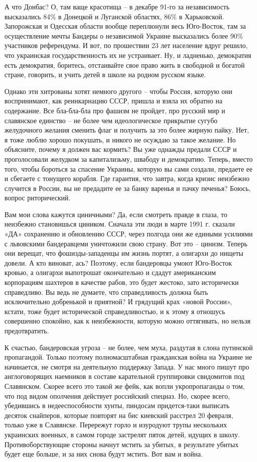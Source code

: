 А что Донбас? О, там ваще красотища – в декабре 91-го за независимость
высказались 84\% в Донецкой и Луганской областях, 86\% в Харьковской. Запорожская
и Одесская области вообще переплюнули весь Юго-Восток, там за осуществление
мечты Бандеры о независимой Украине высказались более 90\% участников
референдума. И вот, по прошествии 23 лет население вдруг решило, что украинская
государственность их не устраивает. Ну, и ладненько, демократия есть
демократия, боритесь, отстаивайте  свое право жить в свободной и богатой
стране, говорить, и учить детей в школе на родном русском языке.

Однако эти хитрованы хотят немного другого – чтобы Россия, которую они
воспринимают, как реинкарнацию СССР,  пришла и взяла их обратно на содержание.
Все бла-бла-бла про фашизм не пройдет, про русский мир и славянское единство –
не более чем идеологическое прикрытие сугубо желудочного желания сменить флаг и
получить за это более жирную пайку. Нет, я тоже люблю хорошо покушать, и никого
не осуждаю за такое желание. Но объясните, почему я должен вас кормить? Вы уже
однажды предали СССР и проголосовали желудком за капитализьму, швабоду и
демократию. Теперь, вместо того, чтобы бороться за спасение Украины, которую вы
сами создали, предаете ее и сбегаете с тонущего корабля. Где гарантия, что
завтра, когда кризис неизбежно случится в России, вы не предадите ее за банку
варенья и пачку печенья? Боюсь, вопрос  риторический.

Вам мои слова кажутся циничными? Да, если смотреть правде в глаза, то неизбежно
становишься циником. Сначала эти люди в марте 1991 г. сказали «ДА» сохранению и
обновлению СССР, через полгода они же едиными усилиями с львовскими
бандеравцеми уничтожили свою страну. Вот это – цинизм. Теперь они верещат, что
фошизды-западенцы им жизнь портят, а олигархи до нищеты довели. А кто виноват,
ась? Поэтому, если бандеровцы умоют Юго-Восток кровью, а олигархи выпотрошат
окончательно и сдадут американским корпорациям шахтеров в качестве рабов, это
будет жестоко, зато исторически справедливо. Вы ведь не думаете, что
справедливость должна быть исключительно добренькой и приятной? И грядущий крах
«новой России», кстати, тоже будет исторической справедливостью, и к этому я
отношусь совершенно спокойно, как к неизбежности, которую можно оттягивать, но
нельзя предотвратить.

К счастью, бандеровская угроза – не более, чем муха, раздутая в слона путинской
пропагандой.  Только поэтому полномасштабная гражданская война на Украине не
начинается, не смотря на деятельную поддержку Запада. У нас много пишут про
англоговорящих наемников в составе карательной группировки свидомитов под
Славянском. Скорее всего это такой же фейк, как вопли укропропаганды о том, что
под видом ополчения действует российский спецназ. Но, скорее всего, убедившись
в недееспособности хунты, пиндосам придется-таки выписать десяток снайперов,
которые повторят на бис киевский расстрел 20 февраля, только уже в Славянске.
Перережут горло и изуродуют трупы нескольких украинских военных, в самом городе
застрелят пяток детей, идущих в школу. Противоборствующие стороны начнут мстить
за убитых, в результате убитых будет еще больше, и за них снова будут мстить.
Вот вам и война.


